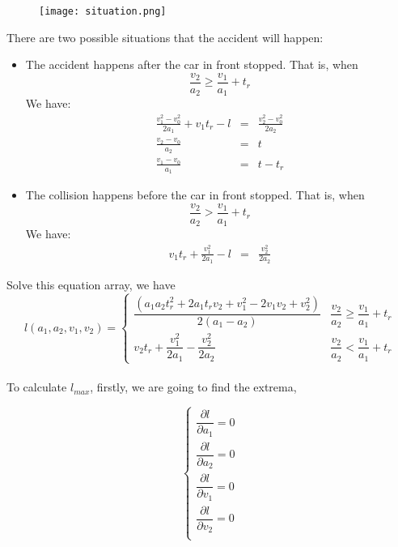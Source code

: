 \begin{figure}[h]
\small
\centering
\texttt{[image: situation.png]}
\caption{}
\end{figure}

There are two possible situations that the accident will 
happen:
\begin{itemize}
\item The accident happens after the car in front stopped.
That is, when
\begin{displaymath}
\frac{v_2}{a_2}  \geq  \frac{v_1}{a_1} + t_r
\end{displaymath}
We have:
\begin{eqnarray}
\frac{v_1^2 - v_0 ^ 2}{2a_1} + v_1 t_r - l & = & \frac{v_2 ^ 2 - v_0 ^ 2}{2a_2}\\
\frac{v_2 - v_0}{a_2} & = & t\\
\frac{v_1 - v_0}{a_1} & = & t - t_r
\end{eqnarray}
\item The collision happens before the car in front stopped. 
That is, when
\begin{displaymath}
\frac{v_2}{a_2}  >  \frac{v_1}{a_1} + t_r
\end{displaymath}
We have:
\begin{eqnarray}
v_1 t_r + \frac{v_1 ^ 2}{2a_1} - l& = &\frac{v_2^2}{2a_2}
\end{eqnarray}
\end{itemize}

Solve this equation array, we have
\begin{displaymath}
l(a_1, a_2, v_1, v_2) = 
\left \{
\begin{array}{cl}
\dfrac{(a_1a_2t_r^2 + 2a_1t_rv_2 + v_1^2 - 2v_1v_2 + v_2^2)}{2(a_1-a_2)} & \dfrac{v_2}{a_2}  \geq \dfrac{v_1}{a_1} + t_r \\
v_2 t_r + \dfrac{v_1 ^ 2}{2a_1} -\dfrac{v_2^2}{2a_2} & \dfrac{v_2}{a_2}  < \dfrac{v_1}{a_1} + t_r
\end{array}
\right .
\end{displaymath}
\\

To calculate $l_{max}$, firstly, we are going to find the extrema,

\begin{displaymath}
\left \{
\begin{array}{cl}
\dfrac{\partial l}{\partial{a_1}} = 0 \\
\dfrac{\partial l}{\partial{a_2}} = 0 \\
\dfrac{\partial l}{\partial{v_1}} = 0 \\
\dfrac{\partial l}{\partial{v_2}} = 0 \\
\end{array}
\right .
\end{displaymath}


